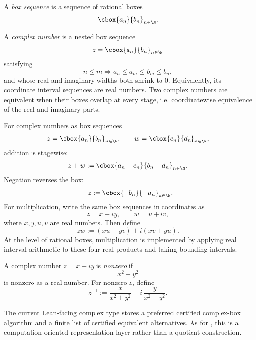 \begin{definition}\label{def:box-sequence}
A \emph{box sequence} is a sequence of rational boxes
\[
  \cbox{a_n}{b_n}_{n\in\N}.
\]
\end{definition}

\begin{definition}\label{def:complex-raw}
A \emph{complex number} is a nested box sequence
\[
  z=\cbox{a_n}{b_n}_{n\in\N}
\]
satisfying
\[
  n\le m\Rightarrow a_n\le a_m\le b_m\le b_n,
\]
and whose real and imaginary widths both shrink to \(0\).  Equivalently, its
coordinate interval sequences are real numbers.  Two complex numbers are
equivalent when their boxes overlap at every stage, i.e. coordinatewise
equivalence of the real and imaginary parts.
\end{definition}

\begin{definition}\label{def:complex-arithmetic}
For complex numbers as box sequences
\[
  z=\cbox{a_n}{b_n}_{n\in\N},\qquad
  w=\cbox{c_n}{d_n}_{n\in\N},
\]
addition is stagewise:
\[
  z+w:=\cbox{a_n+c_n}{b_n+d_n}_{n\in\N}.
\]
Negation reverses the box:
\[
  -z:=\cbox{-b_n}{-a_n}_{n\in\N}.
\]
For multiplication, write the same box sequences in coordinates as
\[
  z=x+iy,\qquad w=u+iv,
\]
where \(x,y,u,v\) are real numbers.  Then define
\[
  zw:=(xu-yv)+i(xv+yu).
\]
At the level of rational boxes, multiplication is implemented by applying
real interval arithmetic to these four real products and taking bounding
intervals.
\end{definition}

\begin{definition}\label{def:complex-inverse}
A complex number \(z=x+iy\) is \emph{nonzero} if
\[
  x^2+y^2
\]
is nonzero as a real number.  For nonzero \(z\), define
\[
  z^{-1}
  :=
  \frac{x}{x^2+y^2}
  -
  i\,\frac{y}{x^2+y^2}.
\]
\end{definition}

\begin{definition}\label{def:complex-quotient}
The current Lean-facing complex type stores a preferred certified complex-box
algorithm and a finite list of certified equivalent alternatives.  As for
, this is a computation-oriented representation layer rather than
a quotient construction.
\end{definition}

